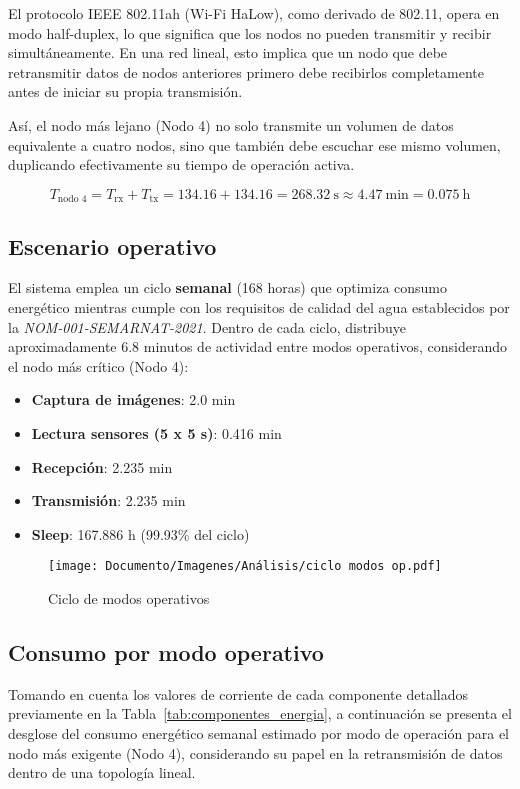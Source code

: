 El protocolo IEEE 802.11ah (Wi-Fi HaLow), como derivado de 802.11, opera en modo half-duplex, lo que significa que los nodos no pueden transmitir y recibir simultáneamente. En una red lineal, esto implica que un nodo que debe retransmitir datos de nodos anteriores primero debe recibirlos completamente antes de iniciar su propia transmisión.

Así, el nodo más lejano (Nodo 4) no solo transmite un volumen de datos equivalente a cuatro nodos, sino que también debe escuchar ese mismo volumen, duplicando efectivamente su tiempo de operación activa.

\[
T_{\text{nodo 4}} = T_{\text{rx}} + T_{\text{tx}} = 134.16 + 134.16 = \boxed{268.32~\text{s}} \approx \boxed{4.47~\text{min}} = 0.075~\text{h}
\]

\subsection{Escenario operativo}

El sistema emplea un ciclo \textbf{semanal} (168 horas) que optimiza consumo energético mientras cumple con los requisitos de calidad del agua establecidos por la \textit{NOM-001-SEMARNAT-2021}. Dentro de cada ciclo, distribuye aproximadamente 6.8 minutos de actividad entre modos operativos, considerando el nodo más crítico (Nodo 4):

\begin{itemize}
    \item \textbf{Captura de imágenes}: 2.0 min
    \item \textbf{Lectura sensores (5 x 5 s)}: 0.416 min
    \item \textbf{Recepción}: 2.235 min
    \item \textbf{Transmisión}: 2.235 min
    \item \textbf{Sleep}: 167.886 h (99.93\% del ciclo)
\end{itemize}

\begin{figure}
    \centering
    \texttt{[image: Documento/Imagenes/Análisis/ciclo modos op.pdf]}
    \caption{Ciclo de modos operativos}
    \label{fig:ciclo_mod_op}
\end{figure}

\subsection*{Consumo por modo operativo}
Tomando en cuenta los valores de corriente de cada componente detallados previamente en la Tabla~\ref{tab:componentes_energia}, a continuación se presenta el desglose del consumo energético semanal estimado por modo de operación para el nodo más exigente (Nodo 4), considerando su papel en la retransmisión de datos dentro de una topología lineal.

